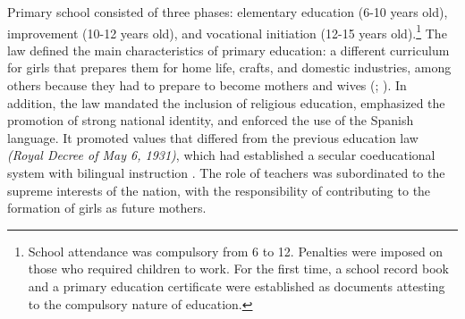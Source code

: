 \documentclass[a4paper,oneside,final,onecolumn,12pt,english]{article}
\begin{document}
Primary school consisted of three phases: %
elementary education (6-10 years old), improvement (10-12 years old), and vocational initiation (12-15 years old).\footnote{School attendance was compulsory from 6 to 12. Penalties were imposed on those who required children to work. For the first time, a school record book and a primary education certificate were established as documents attesting to the compulsory nature of education. %
} The law defined the main characteristics of primary education: a different curriculum for girls that prepares them for home life, crafts, and domestic industries, among others because they had to prepare to become mothers and wives (\cite[][p. 47]{rabazas2006construccion}; \cite[][p. 226]{frances2013reina}). In addition, the law mandated the inclusion of religious education, emphasized the promotion of strong national identity, and enforced the use of the Spanish language. It promoted values that differed from the previous education law \textit{(Royal Decree of May 6, 1931)}, which had established a secular coeducational system with bilingual instruction \citep[][p. 59-61]{morentevalero}. %
The role of teachers was subordinated to the supreme interests of the nation, with the responsibility of contributing to the formation of girls as future mothers. 
\end{document}
